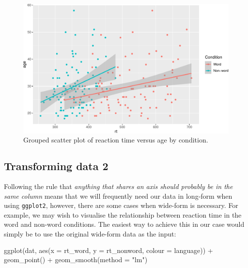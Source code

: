 \documentclass[
  english,
  doc,floatsintext]{apa6}
\newenvironment{Shaded}{\begin{snugshade}}{\end{snugshade}}
\newcommand{\AttributeTok}[1]{\textcolor[rgb]{0.77,0.63,0.00}{#1}}
\newcommand{\FunctionTok}[1]{\textcolor[rgb]{0.00,0.00,0.00}{#1}}
\newcommand{\NormalTok}[1]{#1}
\newcommand{\SpecialCharTok}[1]{\textcolor[rgb]{0.00,0.00,0.00}{#1}}
\newcommand{\StringTok}[1]{\textcolor[rgb]{0.31,0.60,0.02}{#1}}
\begin{document}
\begin{figure}

{\centering \includegraphics[width=1\linewidth]{images/scatter-grouped-1} 

}

\caption{Grouped scatter plot of reaction time versus age by condition.}\label{fig:scatter-grouped}
\end{figure}

\hypertarget{transforming-data-2}{%
\subsection{Transforming data 2}\label{transforming-data-2}}

Following the rule that \emph{anything that shares an axis should probably be in the same column} means that we will frequently need our data in long-form when using \texttt{ggplot2}, however, there are some cases when wide-form is necessary. For example, we may wish to visualise the relationship between reaction time in the word and non-word conditions. The easiest way to achieve this in our case would simply be to use the original wide-form data as the input:

\begin{Shaded}
\begin{Highlighting}[]
\FunctionTok{ggplot}\NormalTok{(dat, }\FunctionTok{aes}\NormalTok{(}\AttributeTok{x =}\NormalTok{ rt\_word, }\AttributeTok{y =}\NormalTok{ rt\_nonword, }\AttributeTok{colour =}\NormalTok{ language)) }\SpecialCharTok{+}
  \FunctionTok{geom\_point}\NormalTok{() }\SpecialCharTok{+}
  \FunctionTok{geom\_smooth}\NormalTok{(}\AttributeTok{method =} \StringTok{"lm"}\NormalTok{)}
\end{Highlighting}
\end{Shaded}
\end{document}
